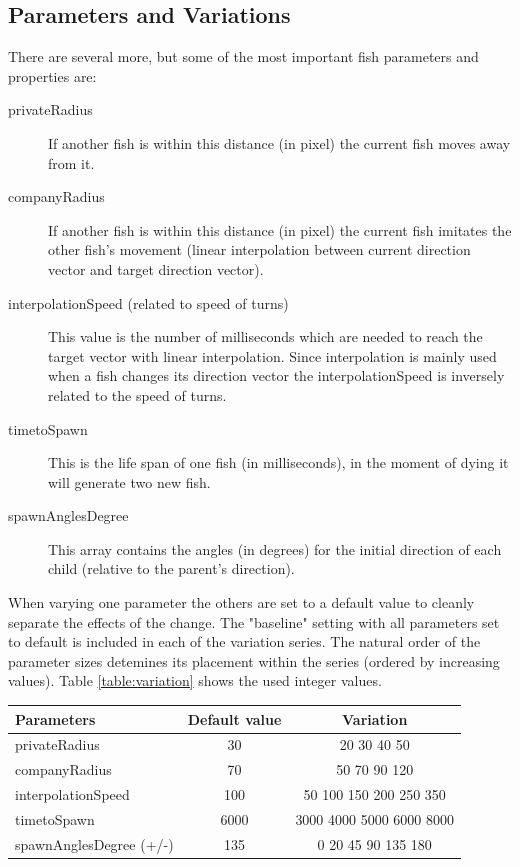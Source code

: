 \documentclass{scrartcl}
\begin{document}
\subsection{Parameters and Variations}
There are several more, but some of the most important fish parameters and properties are:
\begin{description}
\item[privateRadius] If another fish is within this distance (in pixel) the current fish moves away from it.
\item[companyRadius] If another fish is within this distance (in pixel) the current fish imitates the other fish's movement (linear interpolation between current direction vector and target direction vector).
\item[interpolationSpeed (related to speed of turns)] This value is the number of milliseconds which are needed to reach the target vector with linear interpolation. Since interpolation is mainly used when a fish changes its direction vector the interpolationSpeed is inversely related to the speed of turns.
\item[timetoSpawn] This is the life span of one fish (in milliseconds), in the moment of dying it will generate two new fish.
\item[spawnAnglesDegree] This array contains the angles (in degrees) for the initial direction of each child (relative to the parent's direction).
\end{description}

When varying one parameter the others are set to a default value to cleanly separate the effects of the change.
The "baseline" setting with all parameters set to default is included in each of the variation series. The natural order of the parameter sizes detemines its placement within the series (ordered by increasing values). Table \ref{table:variation} shows the used integer values.

\begin{center}
\begin{tabular}{ l | c | c }
  \hline                       
  Parameters 		 & Default value 	& Variation \\
  \hline
  privateRadius 	 & 30 		& 20 30 40 50 \\
  companyRadius 	 & 70 		& 50 70 90 120 \\
  interpolationSpeed & 100 		& 50 100 150 200 250 350 \\
  timetoSpawn 		 & 6000 	& 3000 4000 5000 6000 8000 \\
  spawnAnglesDegree (+/-)  & 135 	& 0 20 45 90 135 180 \\
  \hline  
\end{tabular}
\label{table:variation}
\end{center}
\end{document}
